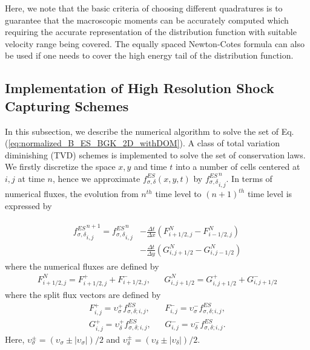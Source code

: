\documentclass{rsproca}%
\begin{document}
Here, we note that the basic criteria of choosing different quadratures is to guarantee that the macroscopic moments can be accurately computed which requiring the accurate representation of the distribution function with suitable velocity range being covered.   The equally spaced Newton-Cotes formula can also be used if one needs to cover the high energy tail of the distribution function.

\subsection{Implementation of High Resolution Shock Capturing Schemes}
\label{TVD}
In this subsection, we describe the numerical algorithm to solve the set  of Eq. (\ref{eq:normalized_B_ES_BGK_2D_withDOM}).  A class of total variation diminishing (TVD) schemes is implemented to solve the set of conservation laws.   We firstly discretize the space $x,y$  and time $t$ into a number of cells centered at $i,j$ at time $n$, hence we approximate $f^{ES}_{\sigma,\delta}(x,y,t)$ by ${f^{ES}_{\sigma,\delta}}_{i,j}^{n}$. In terms of numerical fluxes, the evolution from $n^{th}$ time level to $(n+1)^{th}$ time level is expressed by

\begin{align}
	\begin{split}
{f^{ES}_{\sigma,\delta}}_{i,j}^{n+1} = {f^{ES}_{\sigma,\delta}}_{i,j}^{n}
&-\frac{\Delta t}{\Delta x}\left(F_{i+1/2,j}^N-F_{i-1/2,j}^N\right) \\
&-\frac{\Delta t}{\Delta y}\left(G_{i,j+1/2}^N - G_{i,j-1/2}^N\right)
	\end{split}
\end{align}
where the numerical fluxes are defined by
\begin{align}
&F_{i+1/2,j}^N=F_{i+1/2,j}^+ + F_{i+1/2,j}^-,& &G_{i,j+1/2}^N=G_{i,j+1/2}^+ + G_{i,j+1/2}^-&
\end{align}
where the split flux vectors are defined by
\begin{align}
&F_{i,j}^{+} = \upsilon_\sigma^+ f^{ES}_{\sigma,\delta;i,j},& &F_{i,j}^{-} = \upsilon_\sigma^-f^{ES}_{\sigma,\delta;i,j},& \nonumber \\
&G_{i,j}^{+} = \upsilon_\delta^+ f^{ES}_{\sigma,\delta;i,j},& &G_{i,j}^{-} = \upsilon_\delta^-f^{ES}_{\sigma,\delta;i,j}.&
\end{align}
Here, $\upsilon_\sigma^{\pm} = (\upsilon_\sigma \pm |\upsilon_\sigma |)/2$ and $\upsilon_\delta^{\pm} = (\upsilon_\delta \pm |\upsilon_\delta |)/2$.
\end{document}
